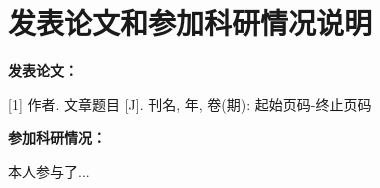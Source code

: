 
\chapter{发表论文和参加科研情况说明}

\textbf{发表论文：}

[1]	作者. 文章题目 [J]. 刊名, 年, 卷(期): 起始页码-终止页码

\vspace{1cm}
\textbf{参加科研情况：}

本人参与了...